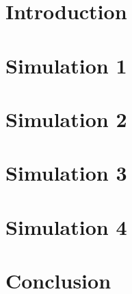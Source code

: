 \documentclass{article}
\begin{document}
\begin{titlepage}

\end{titlepage}
\section{Introduction}

\section{Simulation 1}

\section{Simulation 2}

\section{Simulation 3}

\section{Simulation 4}

\section{Conclusion}

\end{document}
